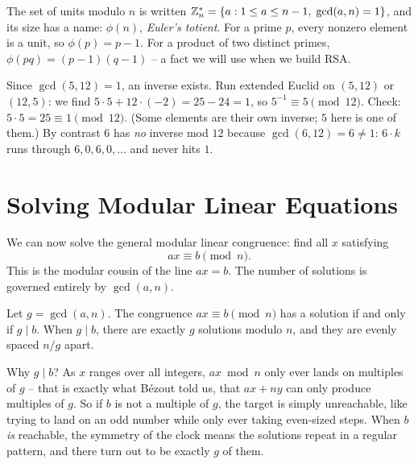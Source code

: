 The set of units modulo $n$ is written $\mathbb{Z}_n^{*} = \{ a : 1 \le a \le n-1,\;
\gcd(a,n) = 1 \}$, and its size has a name: $\phi(n)$, \emph{Euler's totient}.
For a prime $p$, every nonzero element is a unit, so $\phi(p) = p - 1$. For a
product of two distinct primes, $\phi(pq) = (p-1)(q-1)$ -- a fact we will use
when we build RSA.

\begin{example}
\label{ch30:ex-inverse}
Since $\gcd(5,12) = 1$, an inverse exists. Run extended Euclid on $(5,12)$ or
$(12,5)$: we find $5 \cdot 5 + 12 \cdot (-2) = 25 - 24 = 1$, so $5^{-1} \equiv 5
\pmod{12}$. Check: $5 \cdot 5 = 25 \equiv 1 \pmod{12}$. (Some elements are their
own inverse; $5$ here is one of them.) By contrast $6$ has \emph{no} inverse mod
$12$ because $\gcd(6,12) = 6 \neq 1$: $6 \cdot k$ runs through $6, 0, 6, 0,
\dots$ and never hits $1$.
\end{example}

\section{Solving Modular Linear Equations}
\label{ch30:linear}

We can now solve the general modular linear congruence: find all $x$ satisfying
\[
  a x \equiv b \pmod n .
\]
This is the modular cousin of the line $ax = b$. The number of solutions is
governed entirely by $\gcd(a,n)$.

\begin{theorem}
\label{ch30:thm-linear}
Let $g = \gcd(a,n)$. The congruence $ax \equiv b \pmod n$ has a solution if and
only if $g \mid b$. When $g \mid b$, there are exactly $g$ solutions modulo $n$,
and they are evenly spaced $n/g$ apart.
\end{theorem}

\begin{intuitionbox}
Why $g \mid b$? As $x$ ranges over all integers, $ax \bmod n$ only ever lands on
multiples of $g$ -- that is exactly what B\'ezout told us, that $ax + ny$ can
only produce multiples of $g$. So if $b$ is not a multiple of $g$, the target is
simply unreachable, like trying to land on an odd number while only ever taking
even-sized steps. When $b$ \emph{is} reachable, the symmetry of the clock means
the solutions repeat in a regular pattern, and there turn out to be exactly $g$
of them.
\end{intuitionbox}

